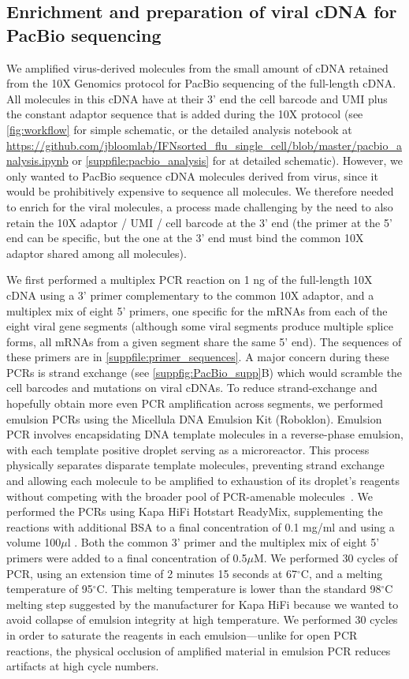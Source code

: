 \documentclass[10pt,letterpaper]{article}
\newcommand{\FIG}[1]{\autoref{fig:#1}}
\newcommand{\SUPPFILE}[1]{\autoref{suppfile:#1}}
\newcommand{\SUPPFIG}[1]{\autoref{suppfig:#1}}
\begin{document}
\subsection*{Enrichment and preparation of viral cDNA for PacBio sequencing}
We amplified virus-derived molecules from the small amount of cDNA retained from the 10X Genomics protocol for PacBio sequencing of the full-length cDNA.
All molecules in this cDNA have at their 3' end the cell barcode and UMI plus the constant adaptor sequence that is added during the 10X protocol (see \FIG{workflow} for simple schematic, or the detailed analysis notebook at \url{https://github.com/jbloomlab/IFNsorted_flu_single_cell/blob/master/pacbio_analysis.ipynb} or \SUPPFILE{pacbio_analysis} for at detailed schematic).
However, we only wanted to PacBio sequence cDNA molecules derived from virus, since it would be prohibitively expensive to sequence all molecules.
We therefore needed to enrich for the viral molecules, a process made challenging by the need to also retain the 10X adaptor / UMI / cell barcode at the 3' end (the primer at the 5' end can be specific, but the one at the 3' end must bind the common 10X adaptor shared among all molecules).

We first performed a multiplex PCR reaction on 1 ng of the full-length 10X cDNA using a 3' primer complementary to the common 10X adaptor, and a multiplex mix of eight 5' primers, one specific for the mRNAs from each of the eight viral gene segments (although some viral segments produce multiple splice forms, all mRNAs from a given segment share the same 5' end).
The sequences of these primers are in \SUPPFILE{primer_sequences}.
A major concern during these PCRs is strand exchange (see \SUPPFIG{PacBio_supp}B) which would scramble the cell barcodes and mutations on viral cDNAs.
To reduce strand-exchange and hopefully obtain more even PCR amplification across segments, we performed emulsion PCRs using the Micellula DNA Emulsion Kit (Roboklon).
Emulsion PCR involves encapsidating DNA template molecules in a reverse-phase emulsion, with each template positive droplet serving as a microreactor.
This process physically separates disparate template molecules, preventing strand exchange and allowing each molecule to be amplified to exhaustion of its droplet's reagents without competing with the broader pool of PCR-amenable molecules~\citep{boers2015micelle}.
We performed the PCRs using Kapa HiFi Hotstart ReadyMix, supplementing the reactions with additional BSA to a final concentration of 0.1 mg/ml and using a volume 100$\mu$l .
Both the common 3' primer and the multiplex mix of eight 5' primers were added to a final concentration of 0.5$\mu$M.
We performed 30 cycles of PCR, using an extension time of 2 minutes 15 seconds at 67$^{\circ}$C, and a melting temperature of 95$^{\circ}$C.
This melting temperature is lower than the standard 98$^{\circ}$C melting step suggested by the manufacturer for Kapa HiFi because we wanted to avoid collapse of emulsion integrity at high temperature.
We performed 30 cycles in order to saturate the reagents in each emulsion---unlike for open PCR reactions, the physical occlusion of amplified material in emulsion PCR reduces artifacts at high cycle numbers.
\end{document}
